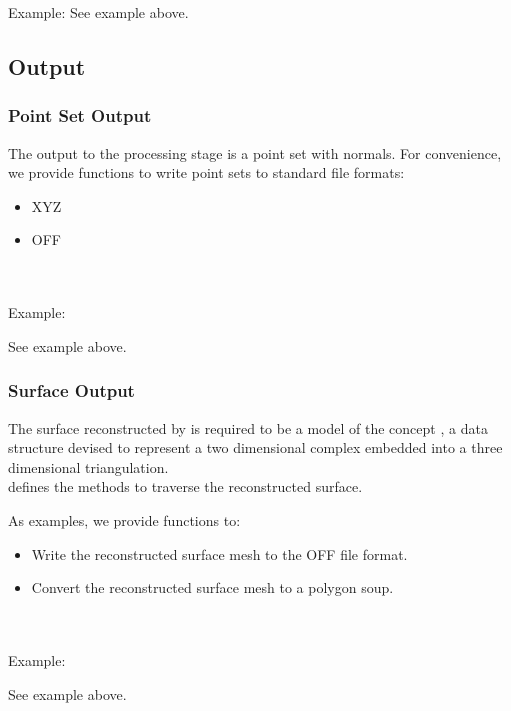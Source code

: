 Example:
See  example above.


\subsection{Output}

\subsubsection{Point Set Output}

The output to the processing stage is a point set with normals. For convenience, we provide functions to write point sets to standard file formats:
\begin{itemize}
\item XYZ
\item OFF
\end{itemize}

  \\
  \\

Example:

See  example above.


\subsubsection{Surface Output}

The surface reconstructed by  is required to be a model of the concept , a data structure devised to represent a two dimensional complex embedded into a three dimensional triangulation.\\

 defines the methods to traverse the reconstructed surface.

As examples, we provide functions to:

\begin{itemize}
\item Write the reconstructed surface mesh to the
      OFF file format.
\item Convert the reconstructed surface mesh to a
      polygon soup.
\end{itemize}

  \\
  \\

Example:

See  example above.
